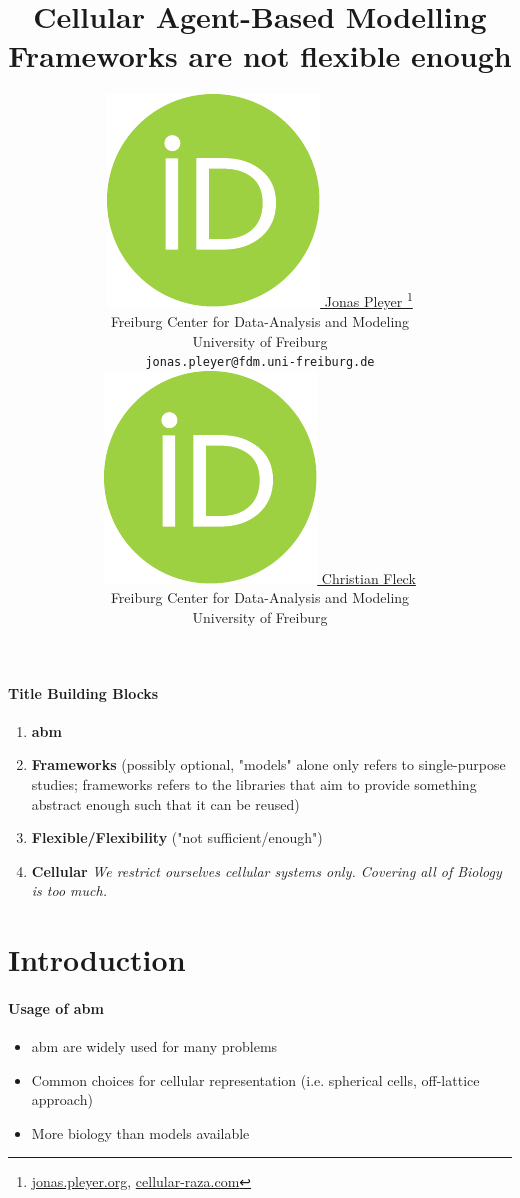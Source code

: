 \documentclass{article}
\title{
    Cellular Agent-Based Modelling Frameworks are not flexible enough
}
\author{
    \href{https://orcid.org/0009-0001-0613-7978}{
        \includegraphics[scale=0.06]{orcid.pdf}
        \hspace{1mm}Jonas Pleyer
    }
    \thanks{
        \href{https://jonas.pleyer.org}{jonas.pleyer.org},
        \href{https://cellular-raza.com}{cellular-raza.com}
    }\\
	Freiburg Center for Data-Analysis and Modeling\\
	University of Freiburg\\
	\texttt{jonas.pleyer@fdm.uni-freiburg.de} \\
	\And
	\href{https://orcid.org/0000-0002-6371-4495}{
        \includegraphics[scale=0.06]{orcid.pdf}
        \hspace{1mm}Christian Fleck
    }\\
	Freiburg Center for Data-Analysis and Modeling\\
	University of Freiburg
}
\begin{document}
\maketitle

\paragraph{Title Building Blocks}
\begin{enumerate}
    \item \textbf{\acl{abm}}
    \item \textbf{Frameworks} (possibly optional, "models" alone only refers to single-purpose studies;
        frameworks refers to the libraries that aim to provide something abstract enough such that
        it can be reused)
    \item \textbf{Flexible/Flexibility} ("not sufficient/enough")
    \item \textbf{Cellular}
        \textit{We restrict ourselves cellular systems only. Covering all of Biology is too much.}
\end{enumerate}

\begin{abstract}
\end{abstract}



\section{Introduction}

\paragraph{Usage of \acl{abm}}
\begin{itemize}
    \item \cite{Pleyer2023} \acl{abm} are widely used for many problems
    \item Common choices for cellular representation (i.e. spherical cells, off-lattice approach)
    \item More biology than models available
\end{itemize}
\end{document}
